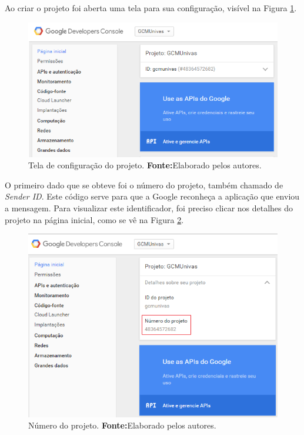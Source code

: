 	\par Ao criar o projeto foi aberta uma tela para sua configuração, visível na
Figura \ref{fig:gcm2}.

	\begin{figure}[h!] 
		\centerline{\includegraphics[scale=0.8]{./imagens/2_q_metodologico/4_procedimentos_resultados/41_gcm/gcm2.png}}
		\caption[Tela de configuração do projeto]{Tela de configuração do projeto.
		\textbf{Fonte:}Elaborado pelos autores.}
		\label{fig:gcm2}
	\end{figure}
	
	\pagebreak
	
	\par O primeiro dado que se obteve foi o número do projeto, também chamado de
\textit{Sender ID}. Este código serve para que a Google reconheça a aplicação
que enviou a mensagem. Para visualizar este identificador, foi preciso clicar
nos detalhes do projeto na página inicial, como se vê na Figura \ref{fig:gcm3}.
	
	\begin{figure}[h!] 
		\centerline{\includegraphics[scale=0.8]{./imagens/2_q_metodologico/4_procedimentos_resultados/41_gcm/gcm3.png}}
		\caption[Número do projeto]{Número do projeto.
		\textbf{Fonte:}Elaborado pelos autores.}
		\label{fig:gcm3}
	\end{figure}
	
